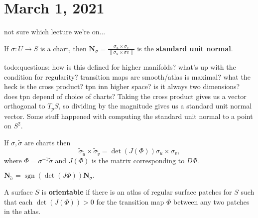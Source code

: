 \section{March 1, 2021}
not sure which lecture we're on...
\begin{definition}[]
    If $\sigma \colon U \to S$ is a chart, then $\mathbf N_{\sigma}= \frac{\sigma_u \times \sigma_v}{\|\sigma_u \times \sigma v\|}$ is the \textbf{standard unit normal}.
\end{definition}
{\color{red}todo:questions: how is this defined for higher manifolds? what's up with the condition for regularity? transition maps are smooth/atlas is maximal? what the heck is the cross product? tpn inn higher space? is it always two dimensions? does tpn depend of choice of charts?} 
Taking the cross product gives us a vector orthogonal to $T_p S$, so dividing by the magnitude gives us a standard unit normal vector. Some stuff happened with computing the standard unit normal to a point on $S^2$.

\begin{lemma}
    If $\sigma,\widetilde \sigma$ are charts then \[
        \widetilde \sigma _{\widetilde u}\times \widetilde \sigma _{\widetilde v}=\det(J(\Phi)) \sigma_u \times \sigma_v,
    \] where $\Phi=\sigma ^{-1} \widetilde \sigma$ and $J(\Phi)$ is the matrix corresponding to $D\Phi$.
\end{lemma}
\begin{cor}
        $\mathbf N_{\widetilde \sigma}=\operatorname{sgn}(\det(J\Phi)) \mathbf N_{\sigma}.$
\end{cor}
\begin{definition}[]
    A surface $S$ is \textbf{orientable} if there is an atlas of regular surface patches for $S$ such that each $\det (J(\Phi))>0$ for the transition map $\Phi$ between any two patches in the atlas.
\end{definition}
